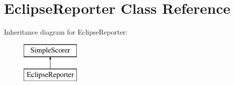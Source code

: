 \hypertarget{class_eclipse_reporter}{
\section{EclipseReporter Class Reference}
\label{class_eclipse_reporter}
}
Inheritance diagram for EclipseReporter:\begin{figure}[H]
\begin{center}
\leavevmode
\includegraphics[height=2.000000cm]{class_eclipse_reporter}
\end{center}
\end{figure}
